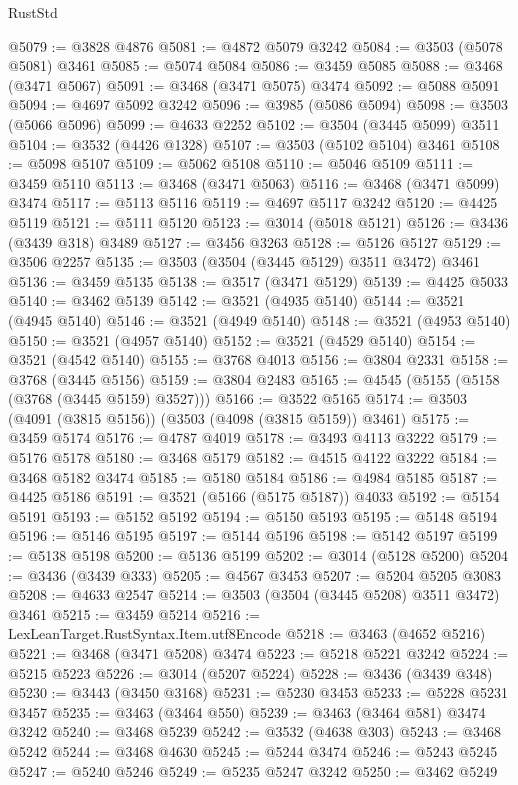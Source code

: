 \begin{lexlean}{RustStd}
\begin{coremodule}
@5079 := @3828 @4876
@5081 := @4872 @5079 @3242
@5084 := @3503 (@5078 @5081) @3461
@5085 := @5074 @5084
@5086 := @3459 @5085
@5088 := @3468 (@3471 @5067)
@5091 := @3468 (@3471 @5075) @3474
@5092 := @5088 @5091
@5094 := @4697 @5092 @3242
@5096 := @3985 (@5086 @5094)
@5098 := @3503 (@5066 @5096)
@5099 := @4633 @2252
@5102 := @3504 (@3445 @5099) @3511
@5104 := @3532 (@4426 @1328)
@5107 := @3503 (@5102 @5104) @3461
@5108 := @5098 @5107
@5109 := @5062 @5108
@5110 := @5046 @5109
@5111 := @3459 @5110
@5113 := @3468 (@3471 @5063)
@5116 := @3468 (@3471 @5099) @3474
@5117 := @5113 @5116
@5119 := @4697 @5117 @3242
@5120 := @4425 @5119
@5121 := @5111 @5120
@5123 := @3014 (@5018 @5121)
@5126 := @3436 (@3439 @318) @3489
@5127 := @3456 @3263
@5128 := @5126 @5127
@5129 := @3506 @2257
@5135 := @3503 (@3504 (@3445 @5129) @3511 @3472) @3461
@5136 := @3459 @5135
@5138 := @3517 (@3471 @5129)
@5139 := @4425 @5033
@5140 := @3462 @5139
@5142 := @3521 (@4935 @5140)
@5144 := @3521 (@4945 @5140)
@5146 := @3521 (@4949 @5140)
@5148 := @3521 (@4953 @5140)
@5150 := @3521 (@4957 @5140)
@5152 := @3521 (@4529 @5140)
@5154 := @3521 (@4542 @5140)
@5155 := @3768 @4013
@5156 := @3804 @2331
@5158 := @3768 (@3445 @5156)
@5159 := @3804 @2483
@5165 := @4545 (@5155 (@5158 (@3768 (@3445 @5159) @3527)))
@5166 := @3522 @5165
@5174 := @3503 (@4091 (@3815 @5156)) (@3503 (@4098 (@3815 @5159)) @3461)
@5175 := @3459 @5174
@5176 := @4787 @4019
@5178 := @3493 @4113 @3222
@5179 := @5176 @5178
@5180 := @3468 @5179
@5182 := @4515 @4122 @3222
@5184 := @3468 @5182 @3474
@5185 := @5180 @5184
@5186 := @4984 @5185
@5187 := @4425 @5186
@5191 := @3521 (@5166 (@5175 @5187)) @4033
@5192 := @5154 @5191
@5193 := @5152 @5192
@5194 := @5150 @5193
@5195 := @5148 @5194
@5196 := @5146 @5195
@5197 := @5144 @5196
@5198 := @5142 @5197
@5199 := @5138 @5198
@5200 := @5136 @5199
@5202 := @3014 (@5128 @5200)
@5204 := @3436 (@3439 @333)
@5205 := @4567 @3453
@5207 := @5204 @5205 @3083
@5208 := @4633 @2547
@5214 := @3503 (@3504 (@3445 @5208) @3511 @3472) @3461
@5215 := @3459 @5214
@5216 := LexLeanTarget.RustSyntax.Item.utf8Encode
@5218 := @3463 (@4652 @5216)
@5221 := @3468 (@3471 @5208) @3474
@5223 := @5218 @5221 @3242
@5224 := @5215 @5223
@5226 := @3014 (@5207 @5224)
@5228 := @3436 (@3439 @348)
@5230 := @3443 (@3450 @3168)
@5231 := @5230 @3453
@5233 := @5228 @5231 @3457
@5235 := @3463 (@3464 @550)
@5239 := @3463 (@3464 @581) @3474 @3242
@5240 := @3468 @5239
@5242 := @3532 (@4638 @303)
@5243 := @3468 @5242
@5244 := @3468 @4630
@5245 := @5244 @3474
@5246 := @5243 @5245
@5247 := @5240 @5246
@5249 := @5235 @5247 @3242
@5250 := @3462 @5249

\end{coremodule}
\end{lexlean}
